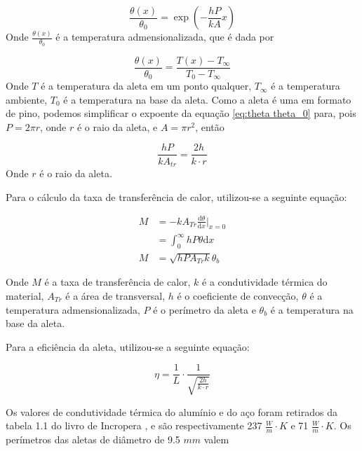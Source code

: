\documentclass[12pt,openright,twoside,a4paper]{abntex2}
\begin{document}
\begin{equation}
	\label{eq:theta theta_0}
	\frac{\theta(x)}{\theta_0} = \exp \left( - \frac{hP}{kA}x \right)
\end{equation}
Onde \(\frac{\theta(x)}{\theta_0}\) é a temperatura admensionalizada, que é dada por

\begin{equation}
	\label{eq:temp admens}
	\frac{\theta(x)}{\theta_0} = \frac{T(x) - T_{\infty}}{T_0 - T_{\infty}}
\end{equation}
Onde \(T\) é a temperatura da aleta em um ponto qualquer, \(T_{\infty}\) é a temperatura ambiente, \(T_0\) é a temperatura na base da aleta.
Como a aleta é uma em formato de pino, podemos simplificar o expoente da equação \eqref{eq:theta theta_0} para, pois \(P = 2 \pi r\), onde \(r\) é o raio da aleta, e \(A = \pi r^2\), então

\begin{equation}
	\label{eq:expoente}
	\frac{hP}{kA_{tr}} = \frac{2h}{k \cdot r}
\end{equation}
Onde \(r\) é o raio da aleta.

Para o cálculo da taxa de transferência de calor, utilizou-se a seguinte equação:

\begin{align}
	\label{eq:taxa de transferencia}
	M & = -k A_{Tr} \frac{\mathrm{d}\theta}{\mathrm{d}x} \bigg|_{x=0} \\
	  & = \int_{0}^{\infty} h P \theta \mathrm{d}x                    \\
	M & = \sqrt{hPA_{Tr}k} \theta_b
\end{align}

Onde \(M\) é a taxa de transferência de calor, \(k\) é a condutividade térmica do material, \(A_{Tr}\) é a área de transversal, \(h\) é o coeficiente de convecção, \(\theta\) é a temperatura admensionalizada, \(P\) é o perímetro da aleta e \(\theta_b\) é a temperatura na base da aleta.

Para a eficiência da aleta, utilizou-se a seguinte equação:

\begin{equation}
	\label{eq:eficiencia}
	\eta = \frac{1}{L} \cdot \frac{1}{\sqrt{\frac{2h}{k \cdot r}}}
\end{equation}

Os valores de condutividade térmica do alumínio e do aço foram retirados da tabela 1.1 do livro de Incropera \cite{incropera2008}, e são respectivamente 237 \(\frac{W}{m} \cdot K\) e 71 \(\frac{W}{m} \cdot K\). Os perímetros das aletas de diâmetro de 9.5 \(mm\) valem
\end{document}
